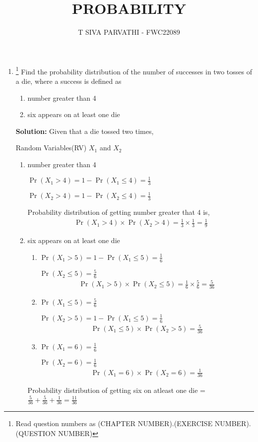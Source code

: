 \documentclass{article}
\providecommand{\pr}[1]{\ensuremath{\Pr\left(#1\right)}}
\newcommand{\solution}{\noindent \textbf{Solution: }}
\begin{document}
\title{PROBABILITY}
\author{\Large T SIVA PARVATHI - FWC22089}
\date{}

\maketitle
\begin{enumerate}[label=13.\arabic{enumi}.\arabic{enumii}]%
\setcounter{enumi}{3}
\setcounter{enumii}{5}

\item \footnote{Read question numbers as (CHAPTER NUMBER).(EXERCISE NUMBER).(QUESTION NUMBER)}
Find the probability distribution of the number of successes in two tosses of a die, where a success is defined as
\begin{enumerate}
\item number greater than 4
\item six appears on at least one die
\end{enumerate}

\solution
Given that a die tossed two times,
\begin{table}[h]\centering
	
	 \caption{Random Variables(RV) $X_1$ and $X_2$}\label{table:1}
\end{table}

\begin{enumerate}
\item number greater than 4

$\pr{X_1>4}=1-\pr{X_1\le4}=\frac{1}{3}$

$\pr{X_2>4}=1-\pr{X_2\le4}=\frac{1}{3}$

Probability distribution of getting number greater that 4 is,
\begin{align}
\pr{X_1>4} \times \pr{X_2>4} = \frac{1}{3} \times \frac{1}{3}=\frac{1}{9}
\end{align}
\item six appears on at least one die
\begin{enumerate}
\item
$\pr{X_1>5}=1-\pr{X_1\le5}=\frac{1}{6}$

$\pr{X_2\le5}=\frac{5}{6}$
\begin{align}
\pr{X_1>5} \times \pr{X_2\le5} = \frac{1}{6} \times \frac{5}{6}=\frac{5}{36}
\end{align}
\item
$\pr{X_1\le5}=\frac{5}{6}$

$\pr{X_2>5}=1-\pr{X_1\le5}=\frac{1}{6}$
\begin{align}
\pr{X_1\le5} \times \pr{X_2>5} = \frac{5}{36}
\end{align}
\item
$\pr{X_1=6}=\frac{1}{6}$

$\pr{X_2=6}=\frac{1}{6}$
\begin{align}
\pr{X_1=6} \times \pr{X_2=6}=\frac{1}{36}
\end{align}
\end{enumerate}
Probability distribution of getting six on atleast one die = $\frac{5}{36}+\frac{5}{36}+\frac{1}{36}=\frac{11}{36}$
\end{enumerate}
\end{enumerate}
\end{document}
